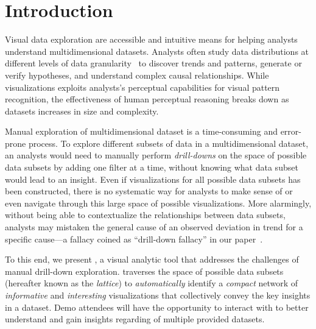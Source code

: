 \section{Introduction}
Visual data exploration are accessible and intuitive means for helping analysts understand multidimensional datasets. Analysts often study data distributions at different levels of data granularity~\cite{Anand2015,Wu2013,Heer2012} to discover trends and patterns, generate or verify hypotheses, and understand complex causal relationships. While visualizations exploits analysts's perceptual capabilities for visual pattern recognition, the effectiveness of human perceptual reasoning breaks down as datasets increases in size and complexity. 
\par Manual exploration of multidimensional dataset is a time-consuming and error-prone process. To explore different subsets of data in a multidimensional dataset, an analysts would need to manually perform \emph{drill-downs} on the space of possible data subsets by adding one filter at a time, without knowing what data subset would lead to an insight. Even if visualizations for all possible data subsets has been constructed, there is no systematic way for analysts to make sense of or even navigate through this large space of possible visualizations. More alarmingly, without being able to contextualize the relationships between data subsets, analysts may mistaken the general cause of an observed deviation in trend for a specific cause---a fallacy coined as ``drill-down fallacy'' in our paper~\cite{}.
\par To this end, we present \vispilot, a visual analytic tool that addresses the challenges of manual drill-down exploration. \vispilot traverses the space of possible data subsets (hereafter known as the \emph{lattice}) to \emph{automatically} identify a \emph{compact} network of  \emph{informative} and  \emph{interesting} visualizations that collectively convey the key insights in a dataset. Demo attendees will have the opportunity to interact with \vispilot to better understand and gain insights regarding of multiple provided datasets.